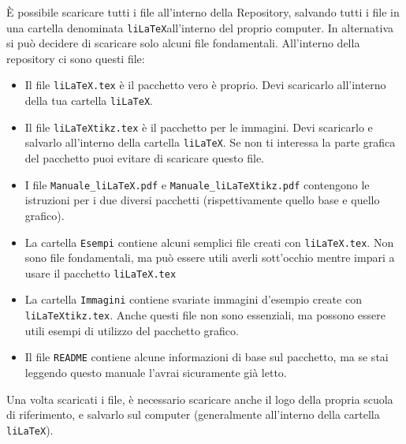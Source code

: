 \documentclass[italian, a4paper]{article}
\newcommand{\ttt}[1]{\texttt{#1}}
\newcommand{\liLaTeX}{\ttt{liLaTeX}}
\begin{document}
È possibile scaricare tutti i file all'interno della Repository, salvando tutti i file in una cartella denominata \liLaTeX all'interno del proprio computer. In alternativa si può decidere di scaricare solo alcuni file fondamentali. All'interno della repository ci sono questi file:
\begin{itemize}
\item Il file \ttt{liLaTeX.tex} è il pacchetto vero è proprio. Devi scaricarlo all'interno della tua cartella \liLaTeX.
\item Il file \ttt{liLaTeXtikz.tex} è il pacchetto per le immagini. Devi scaricarlo e salvarlo all'interno della cartella \liLaTeX. Se non ti interessa la parte grafica del pacchetto puoi evitare di scaricare questo file.
\item I file \ttt{Manuale\_liLaTeX.pdf} e \ttt{Manuale\_liLaTeXtikz.pdf} contengono le istruzioni per i due diversi pacchetti (rispettivamente quello base e quello grafico).
\item La cartella \ttt{Esempi} contiene alcuni semplici file creati con \ttt{liLaTeX.tex}. Non sono file fondamentali, ma può essere utili averli sott'occhio mentre impari a usare il pacchetto \ttt{liLaTeX.tex}
\item La cartella \ttt{Immagini} contiene svariate immagini d'esempio create con \ttt{liLaTeXtikz.tex}. Anche questi file non sono essenziali, ma possono essere utili esempi di utilizzo del pacchetto grafico.
\item Il file \ttt{README} contiene alcune informazioni di base sul pacchetto, ma se stai leggendo questo manuale l'avrai sicuramente già letto.
\end{itemize}

Una volta scaricati i file, è necessario scaricare anche il logo della propria scuola di riferimento, e salvarlo sul computer (generalmente all'interno della cartella \liLaTeX).
\end{document}
